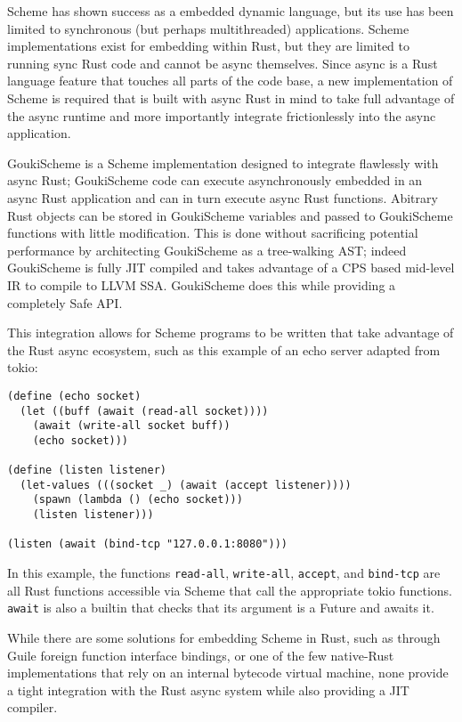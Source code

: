 \documentclass[sigplan,authordraft]{acmart}
\begin{document}
Scheme has shown success as a embedded dynamic language, but its use has been
limited to synchronous (but perhaps multithreaded) applications. Scheme
implementations exist for embedding within Rust, but they are limited to running
sync Rust code and cannot be async themselves. Since async is a Rust language
feature that touches all parts of the code base, a new implementation of Scheme
is required that is built with async Rust in mind to take full advantage of the
async runtime and more importantly integrate frictionlessly into the async
application.

GoukiScheme is a Scheme implementation designed to integrate flawlessly with
async Rust; GoukiScheme code can execute asynchronously embedded in an async
Rust application and can in turn execute async Rust functions. Abitrary Rust
objects can be stored in GoukiScheme variables and passed to GoukiScheme
functions with little modification. This is done without sacrificing potential
performance by architecting GoukiScheme as a tree-walking AST; indeed GoukiScheme
is fully JIT compiled and takes advantage of a CPS based mid-level IR to compile
to LLVM SSA. GoukiScheme does this while providing a completely Safe API.

This integration allows for Scheme programs to be written that take advantage
of the Rust async ecosystem, such as this example of an echo server adapted
from tokio:

\begin{verbatim}
(define (echo socket)
  (let ((buff (await (read-all socket))))
    (await (write-all socket buff))
    (echo socket)))

(define (listen listener)
  (let-values (((socket _) (await (accept listener))))
    (spawn (lambda () (echo socket)))
    (listen listener)))

(listen (await (bind-tcp "127.0.0.1:8080")))
\end{verbatim}

In this example, the functions \texttt{read-all}, \texttt{write-all},
\texttt{accept}, and \texttt{bind-tcp} are all Rust functions accessible via
Scheme that call the appropriate tokio functions. \texttt{await} is also
a builtin that checks that its argument is a Future and awaits it.

While there are some solutions for embedding Scheme in Rust, such as through
Guile foreign function interface bindings, or one of the few native-Rust
implementations that rely on an internal bytecode virtual machine, none provide
a tight integration with the Rust async system while also providing a JIT
compiler.
\end{document}
